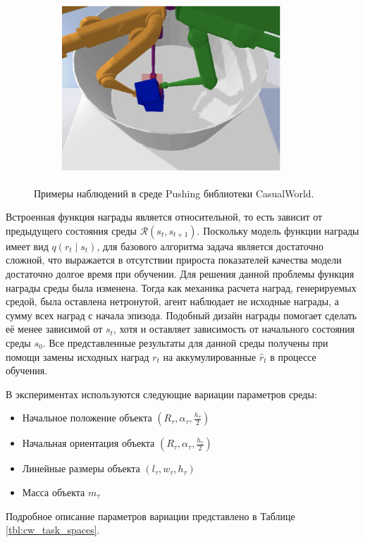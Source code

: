 \begin{figure}[t]
\begin{subfigure}{.3\textwidth}
        \includegraphics[width=\linewidth]{figures/obs_3.png}
    \end{subfigure}
    \caption{Примеры наблюдений в среде Pushing библиотеки CasualWorld.}
    \label{fig:cw}
\end{figure}

Встроенная функция награды является относительной, то есть зависит от предыдущего состояния среды $\mathcal{R}\left(s_t, s_{t+1}\right)$. 
Поскольку модель функции награды имеет вид $q\left(r_t \mid s_t\right)$, для базового алгоритма задача является достаточно сложной, что выражается в отсутствии прироста показателей качества модели достаточно долгое время при обучении.
Для решения данной проблемы функция награды среды была изменена.
Тогда как механика расчета наград, генерируемых средой, была оставлена нетронутой, агент наблюдает не исходные награды, а сумму всех наград с начала эпизода.
Подобный дизайн награды помогает сделать её менее зависимой от $s_t$, хотя и оставляет зависимость от начального состояния среды $s_0$.
Все представленные результаты для данной среды получены при помощи замены исходных наград $r_t$ на аккумулированные $\hat{r}_t$ в процессе обучения.

В экспериментах используются следующие вариации параметров среды:
\begin{itemize}
    \item Начальное положение объекта $\left(R_{\tau}, \alpha_{\tau}, \frac{h_{\tau}}{2}\right)$
    \item Начальная ориентация объекта $\left(R_{\tau}, \alpha_{\tau}, \frac{h_{\tau}}{2}\right)$
    \item Линейные размеры объекта $\left(l_{\tau}, w_{\tau}, h_{\tau}\right)$
    \item Масса объекта $m_{\tau}$
\end{itemize}
Подробное описание параметров вариации представлено в Таблице \ref{tbl:cw_task_spaces}.

